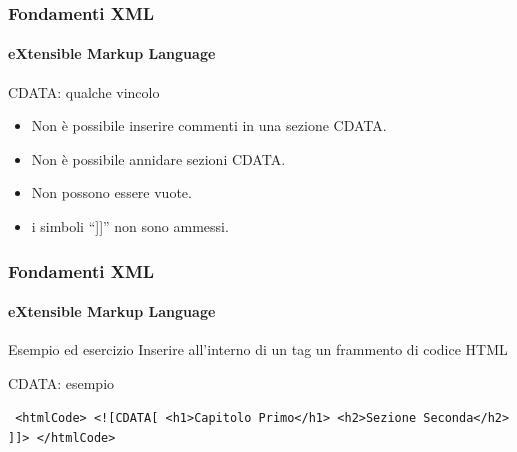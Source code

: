 \begin{frame}
    \frametitle{Fondamenti XML}
    \framesubtitle{eXtensible Markup Language}
    \addtocounter{nframe}{1}

	\begin{block}{CDATA: qualche vincolo}
		\begin{itemize}
			\item Non è possibile inserire commenti in una sezione CDATA.
			\item Non è possibile annidare sezioni CDATA. 
			\item Non possono essere vuote.
			\item i simboli ``]]'' non sono ammessi.
		\end{itemize}
	\end{block}

\end{frame}


\begin{frame}
    \frametitle{Fondamenti XML}
    \framesubtitle{eXtensible Markup Language}
    \addtocounter{nframe}{1}

	\begin{block}{Esempio ed esercizio}
		Inserire all'interno di un tag un frammento di codice HTML
	\end{block}

	\begin{block}{CDATA: esempio}
		\begin{center}
			\texttt{
			<htmlCode>
			 <![CDATA[
			 		<h1>Capitolo Primo</h1>
			 		<h2>Sezione Seconda</h2>
			 	]]>
			 </htmlCode>
			 }
		\end{center}
	\end{block}

\end{frame}



